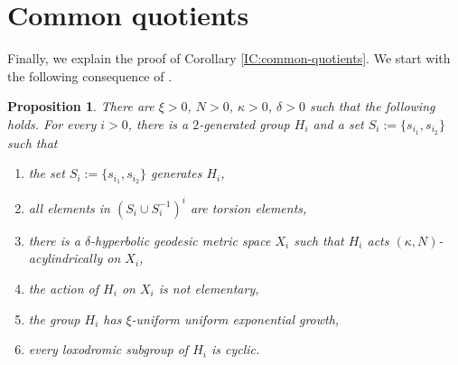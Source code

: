 \documentclass[leqno,a4paper,10pt]{amsart}
\theoremstyle{plain}
\newtheorem{prop}[thm]{Proposition}
\theoremstyle{definition}
\theoremstyle{remark}
\begin{document}
\section{Common quotients}
Finally, we explain the proof of Corollary \ref{IC:common-quotients}. 
 We start with the following consequence of \cite{coulon_product_2022}. 
 
 \begin{prop}\label{P: groups-large-torsion-balls}
 There  are $\xi>0$, $N>0$, $\kappa>0$, $\delta>0$ such that the following holds. For every $i>0$, there is a $2$-generated group $H_i$ and a set $S_i:=\{s_{i_1},s_{i_2}\}$ such that  
 \begin{enumerate}
 \item the set  $S_i:=\{s_{i_1},s_{i_2}\}$ generates $H_i$,
 \item  all elements in $(S_i\cup S_{i}^{-1})^i$ are torsion elements,
\item there is a $\delta$-hyperbolic geodesic metric space $X_i$ such that $H_i$ acts $(\kappa,N)$-acylindrically on $X_i$,
\item the action of $H_i$ on $X_i$ is not elementary, 
\item the group $H_i$ has $\xi$-uniform uniform exponential growth,
\item every loxodromic subgroup of $H_i$ is cyclic.  
 \end{enumerate}
 \end{prop}
 
\end{document}
